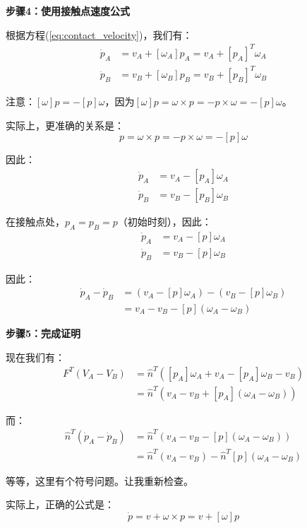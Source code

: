 \documentclass[12pt,a4paper]{article}
\begin{document}
\textbf{步骤4：使用接触点速度公式}

根据方程(\ref{eq:contact_velocity})，我们有：
\begin{align}
\dot{p}_A &= v_A + [\omega_A] p_A = v_A + [p_A]^T \omega_A \\
\dot{p}_B &= v_B + [\omega_B] p_B = v_B + [p_B]^T \omega_B
\end{align}

注意：$[\omega] p = -[p] \omega$，因为$[\omega] p = \omega \times p = -p \times \omega = -[p] \omega$。

实际上，更准确的关系是：
\begin{equation}
[\omega] p = \omega \times p = -p \times \omega = -[p] \omega
\end{equation}

因此：
\begin{align}
\dot{p}_A &= v_A - [p_A] \omega_A \\
\dot{p}_B &= v_B - [p_B] \omega_B
\end{align}

在接触点处，$p_A = p_B = p$（初始时刻），因此：
\begin{align}
\dot{p}_A &= v_A - [p] \omega_A \\
\dot{p}_B &= v_B - [p] \omega_B
\end{align}

因此：
\begin{align}
\dot{p}_A - \dot{p}_B &= (v_A - [p] \omega_A) - (v_B - [p] \omega_B) \\
&= v_A - v_B - [p] (\omega_A - \omega_B)
\end{align}

\textbf{步骤5：完成证明}

现在我们有：
\begin{align}
F^T (V_A - V_B) &= \hat{n}^T ([p_A] \omega_A + v_A - [p_A] \omega_B - v_B) \\
&= \hat{n}^T (v_A - v_B + [p_A] (\omega_A - \omega_B))
\end{align}

而：
\begin{align}
\hat{n}^T (\dot{p}_A - \dot{p}_B) &= \hat{n}^T (v_A - v_B - [p] (\omega_A - \omega_B)) \\
&= \hat{n}^T (v_A - v_B) - \hat{n}^T [p] (\omega_A - \omega_B)
\end{align}

等等，这里有个符号问题。让我重新检查。

实际上，正确的公式是：
\begin{equation}
\dot{p} = v + \omega \times p = v + [\omega] p
\end{equation}
\end{document}
